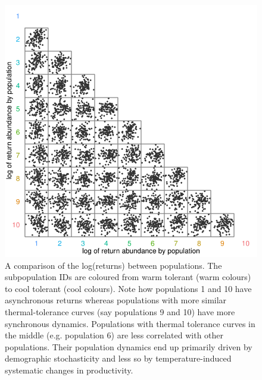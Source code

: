 \begin{figure}[htbp]
\centering
\includegraphics[width=4.5in]{metafolio/example-return-correlations}
\caption{A comparison of the log(returns) between populations. The
subpopulation IDs are coloured from warm tolerant (warm colours) to cool
tolerant (cool colours). Note how populations 1 and 10 have asynchronous
returns whereas populations with more similar thermal-tolerance curves (say
populations 9 and 10) have more synchronous dynamics. Populations with
thermal tolerance curves in the middle (e.g. population 6) are less
correlated with other populations. Their population dynamics end up primarily
driven by demographic stochasticity and less so by temperature-induced
systematic changes in productivity.}
\label{f:ret-corr}
\end{figure}

\clearpage


